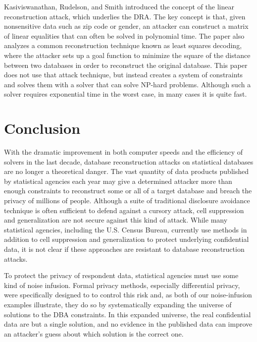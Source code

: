 \documentclass[runningheads]{llncs}
\begin{document}
Kasiviswanathan, Rudelson, and Smith\cite{Kasiviswanathan:2013:PLR:2627817.2627919} introduced
the concept of the linear reconstruction attack, which underlies the  DRA. The key concept is that,
given nonsensitive data such as zip code or gender, an attacker
can construct a matrix of linear equalities that can often be solved
in polynomial time. The paper also analyzes a common reconstruction
technique known as least squares decoding, where the attacker sets up
a goal function to minimize the square of the distance between two
databases in order to reconstruct the original database. This paper
does not use that attack technique, but instead creates a system of
constraints and solves them with a solver that can solve NP-hard
problems. Although such a solver requires exponential time in the
worst case, in many cases it is quite fast.

\section{Conclusion}

With the dramatic improvement in both computer speeds and the
efficiency of solvers in the last decade, database reconstruction
attacks on statistical databases are no longer a theoretical
danger. The vast quantity of data products published by statistical
agencies each year may give a determined attacker more than enough
constraints to reconstruct some or all of a target database and breach
the privacy of millions of people. Although a suite of traditional
disclosure avoidance technique is often sufficient to defend against a
cursory attack, cell suppression and generalization are not secure
against this kind of attack.  While many statistical agencies,
including the U.S. Census Bureau, currently use methods in addition to
cell suppression and generalization to protect underlying confidential
data, it is not clear if these approaches are resistant to database
reconstruction attacks.

To protect the privacy of respondent data, statistical agencies must
use some kind of noise infusion.  Formal privacy methods, especially
differential privacy, were specifically designed to to control this
risk and, as both of our noise-infusion examples illustrate, they do
so by systematically expanding the universe of solutions to the DBA
constraints. In this expanded universe, the real confidential data are
but a single solution, and no evidence in the published data can
improve an attacker's guess about which solution is the correct one.
\end{document}
